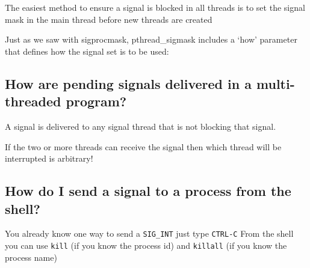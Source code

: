 The easiest method to ensure a signal is blocked in all threads is to
set the signal mask in the main thread before new threads are created

\begin{Shaded}
\begin{Highlighting}[]

\end{Highlighting}
\end{Shaded}

Just as we saw with sigprocmask, pthread\_sigmask includes a `how'
parameter that defines how the signal set is to be used:

\begin{Shaded}
\begin{Highlighting}[]
\end{Highlighting}
\end{Shaded}

\subsection{How are pending signals delivered in a multi-threaded
program?}\label{how-are-pending-signals-delivered-in-a-multi-threaded-program}

A signal is delivered to any signal thread that is not blocking that
signal.

If the two or more threads can receive the signal then which thread will
be interrupted is arbitrary!

\subsection{How do I send a signal to a process from the
shell?}\label{how-do-i-send-a-signal-to-a-process-from-the-shell}

You already know one way to send a \texttt{SIG\_INT} just type
\texttt{CTRL-C} From the shell you can use \texttt{kill} (if you know
the process id) and \texttt{killall} (if you know the process name)

